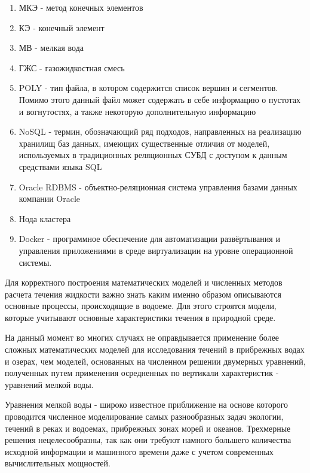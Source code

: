 \documentclass[14pt]{extreport}
\begin{document}


\tableofcontents

\abbreviations

\begin{enumerate}
\item МКЭ - метод конечных элементов
\item КЭ - конечный элемент
\item МВ - мелкая вода
\item ГЖС - газожидкостная смесь
\item POLY - тип файла, в котором содержится список вершин и сегментов. Помимо этого данный файл может содержать в себе информацию о пустотах и вогнутостях, а также некоторую дополнительную информацию\cite{bib:website:quake:poly}
\item NoSQL - термин, обозначающий ряд подходов, направленных на реализацию хранилищ баз данных, имеющих существенные отличия от моделей, используемых в традиционных реляционных СУБД с доступом к данным средствами языка SQL
\item Oracle RDBMS - объектно-реляционная система управления базами данных компании Oracle
\item Нода кластера
\item Docker - программное обеспечение для автоматизации развёртывания и управления приложениями в среде виртуализации на уровне операционной системы. 
\end{enumerate}

\intro

Для корректного построения математических моделей и численных методов расчета течения жидкости важно знать каким именно образом описываются основные процессы, происходящие в водоеме. Для этого строятся модели, которые учитывают основные характеристики течения в природной среде.

На данный момент во многих случаях не оправдывается применение более сложных математических моделей для исследования течений в прибрежных водах и озерах, чем моделей, основанных на численном решении двумерных уравнений, полученных путем применения осредненных по вертикали характеристик - уравнений мелкой воды. 

Уравнения мелкой воды - широко известное приближение на основе которого проводится численное моделирование самых разнообразных задач экологии, течений в реках и водоемах, прибрежных зонах морей и океанов. Трехмерные решения нецелесообразны, так как они требуют намного большего количества исходной информации и машинного времени даже с учетом современных вычислительных мощностей.
\end{document}
